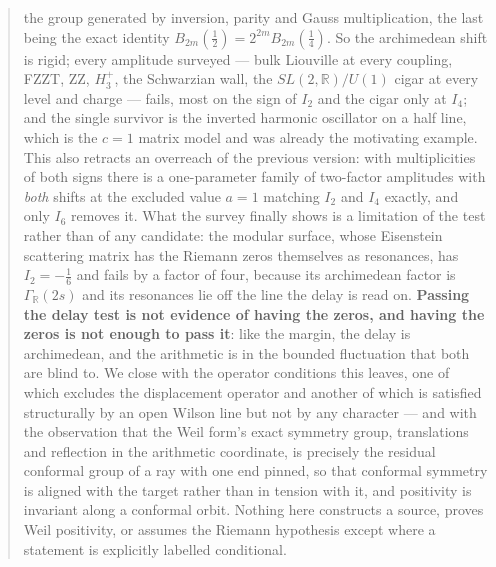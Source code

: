 \documentclass[11pt]{article}
\numberwithin{equation}{section}
\theoremstyle{definition}
\theoremstyle{remark}
\newcommand{\R}{\mathbb R}
\begin{document}
\begin{abstract}
the group generated by inversion, parity and Gauss multiplication, the last being
the exact identity $B_{2m}(\frac12)=2^{2m}B_{2m}(\frac14)$. So the archimedean
shift is rigid; every amplitude surveyed --- bulk Liouville at every coupling,
FZZT, ZZ, $H_3^+$, the Schwarzian wall, the $SL(2,\R)/U(1)$ cigar at every level
and charge --- fails, most on the sign of $I_2$ and the cigar only at $I_4$; and
the single survivor is the inverted harmonic oscillator on a half line, which is
the $c=1$ matrix model and was already the motivating example. This also retracts
an overreach of the previous version: with multiplicities of both signs there is
a one-parameter family of two-factor amplitudes with \emph{both} shifts at the
excluded value $a=1$ matching $I_2$ and $I_4$ exactly, and only $I_6$ removes it.
What the survey finally shows is a limitation of the test rather than of any
candidate: the modular surface, whose Eisenstein scattering matrix has the
Riemann zeros themselves as resonances, has $I_2=-\frac16$ and fails by a factor
of four, because its archimedean factor is $\Gamma_\R(2s)$ and its resonances lie
off the line the delay is read on. \textbf{Passing the delay test is not evidence
of having the zeros, and having the zeros is not enough to pass it}: like the
margin, the delay is archimedean, and the arithmetic is in the bounded
fluctuation that both are blind to.
We close with the operator conditions this leaves, one of
which excludes the displacement operator and another of which is satisfied
structurally by an open Wilson line but not by any character --- and with the
observation that the Weil form's exact symmetry group, translations and
reflection in the arithmetic coordinate, is precisely the residual conformal
group of a ray with one end pinned, so that conformal symmetry is aligned with
the target rather than in tension with it, and positivity is invariant along a
conformal orbit. Nothing here
constructs a source, proves Weil positivity, or assumes the Riemann hypothesis
except where a statement is explicitly labelled conditional.
\end{abstract}

\clearpage
{\small\tableofcontents}
\clearpage











\appendix

\clearpage
{}
{}

\end{document}
